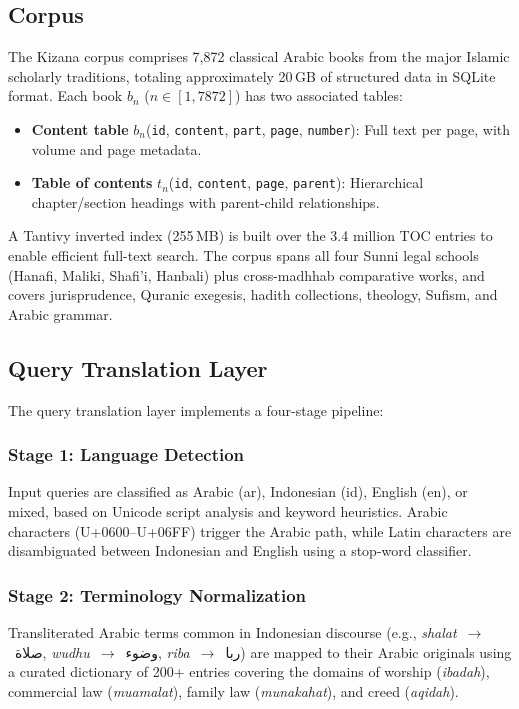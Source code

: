 \documentclass[preprint,12pt,authoryear]{elsarticle}
\begin{document}
\subsection{Corpus}

The Kizana corpus comprises 7,872 classical Arabic books from the major Islamic scholarly traditions, totaling approximately 20\,GB of structured data in SQLite format. Each book $b_n$ ($n \in [1, 7872]$) has two associated tables:

\begin{itemize}
    \item \textbf{Content table} $b_n$(\texttt{id}, \texttt{content}, \texttt{part}, \texttt{page}, \texttt{number}): Full text per page, with volume and page metadata.
    \item \textbf{Table of contents} $t_n$(\texttt{id}, \texttt{content}, \texttt{page}, \texttt{parent}): Hierarchical chapter/section headings with parent-child relationships.
\end{itemize}

A Tantivy inverted index (255\,MB) is built over the 3.4 million TOC entries to enable efficient full-text search. The corpus spans all four Sunni legal schools (Hanafi, Maliki, Shafi'i, Hanbali) plus cross-madhhab comparative works, and covers jurisprudence, Quranic exegesis, hadith collections, theology, Sufism, and Arabic grammar.

\subsection{Query Translation Layer}
\label{sec:translation}

The query translation layer implements a four-stage pipeline:

\subsubsection{Stage 1: Language Detection}
Input queries are classified as Arabic (ar), Indonesian (id), English (en), or mixed, based on Unicode script analysis and keyword heuristics. Arabic characters (U+0600–U+06FF) trigger the Arabic path, while Latin characters are disambiguated between Indonesian and English using a stop-word classifier.

\subsubsection{Stage 2: Terminology Normalization}
Transliterated Arabic terms common in Indonesian discourse (e.g., \textit{shalat}~$\rightarrow$~صلاة, \textit{wudhu}~$\rightarrow$~وضوء, \textit{riba}~$\rightarrow$~ربا) are mapped to their Arabic originals using a curated dictionary of 200+ entries covering the domains of worship (\textit{ibadah}), commercial law (\textit{muamalat}), family law (\textit{munakahat}), and creed (\textit{aqidah}).
\end{document}
